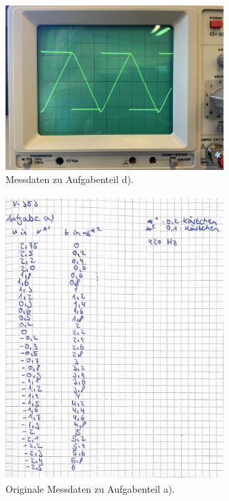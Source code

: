 \begin{figure}[H]
    \centering
    \includegraphics[width=0.75\textwidth]{Dateien/d.3.jpeg}
    \caption{Messdaten zu Aufgabenteil d).}
    \label{fig:d.3}
\end{figure}


\begin{figure}[H]
    \centering
    \includegraphics[width=0.75\textwidth]{Dateien/daten1.jpg}
    \caption{Originale Messdaten zu Aufgabenteil a).}
    \label{fig:daten1}
\end{figure}

